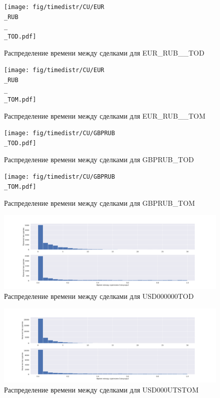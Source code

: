 \begin{figure}
        \texttt{[image: fig/timedistr/CU/EUR\\\_RUB\\\_\\\_TOD.pdf]}
        \caption{Распределение времени между сделками для EUR\_RUB\_\_TOD}
        \label{app}
\end{figure}
\begin{figure}
    \texttt{[image: fig/timedistr/CU/EUR\\\_RUB\\\_\\\_TOM.pdf]}
    \caption{Распределение времени между сделками для EUR\_RUB\_\_TOM}
    \label{app}
\end{figure}
\begin{figure}
        \texttt{[image: fig/timedistr/CU/GBPRUB\\\_TOD.pdf]}
        \caption{Распределение времени между сделками для GBPRUB\_TOD}
        \label{app}
\end{figure}
\begin{figure}
        \texttt{[image: fig/timedistr/CU/GBPRUB\\\_TOM.pdf]}
        \caption{Распределение времени между сделками для GBPRUB\_TOM}
        \label{app}
\end{figure}
\begin{figure}
        \includegraphics[scale=0.35]{fig/timedistr/CU/USD000000TOD.pdf}
        \caption{Распределение времени между сделками для USD000000TOD}
        \label{app}
\end{figure}
\begin{figure}
        \includegraphics[scale=0.35]{fig/timedistr/CU/USD000UTSTOM.pdf}
        \caption{Распределение времени между сделками для USD000UTSTOM}
        \label{append}
\end{figure}